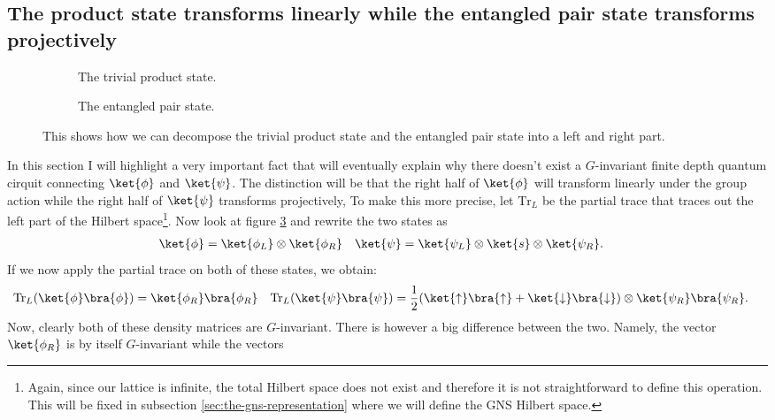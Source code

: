 \subsection{The product state transforms linearly while the entangled pair state transforms projectively}
\begin{figure}
	\centering
	\begin{subfigure}{\textwidth}
		\centering
		
		\caption{The trivial product state.}
		\label{fig:TrivialProductStateTwoParts}
	\end{subfigure}
	\begin{subfigure}{\textwidth}
		\centering
		
		\caption{The entangled pair state.}
		\label{fig:FakeAKLT_State_TwoParts}
	\end{subfigure}
	\caption{This shows how we can decompose the trivial product state and the entangled pair state into a left and right part.}
	\label{fig:TheTwoHaldanePhasesTwoParts}
\end{figure}
In this section I will highlight a very important fact that will eventually explain why there doesn't exist a $G$-invariant finite depth quantum cirquit connecting $\ket{\phi}$ and $\ket{\psi}$. The distinction will be that the right half of $\ket{\phi}$ will transform linearly under the group action while the right half of $\ket{\psi}$ transforms projectively, To make this more precise, let $\textrm{Tr}_L$ be the partial trace that traces out the left part of the Hilbert space\footnote{Again, since our lattice is infinite, the total Hilbert space does not exist and therefore it is not straightforward to define this operation. This will be fixed in subsection \ref{sec:the-gns-representation} where we will define the GNS Hilbert space.}. Now look at figure \ref{fig:TheTwoHaldanePhasesTwoParts} and rewrite the two states as
\begin{align}
	\ket{\phi}&=\ket{\phi_L}\otimes\ket{\phi_R}&\ket{\psi}&=\ket{\psi_L}\otimes\ket{s}\otimes\ket{\psi_R}.
\end{align}
If we now apply the partial trace on both of these states, we obtain:
\begin{align}
	\textrm{Tr}_L(\ket{\phi}\bra{\phi})&=\ket{\phi_R}\bra{\phi_R}&\textrm{Tr}_L(\ket{\psi}\bra{\psi})&=\frac{1}{2}(\ket{\uparrow}\bra{\uparrow}+\ket{\downarrow}\bra{\downarrow})\otimes \ket{\psi_R}\bra{\psi_R}.
\end{align}
Now, clearly both of these density matrices are $G$-invariant. There is however a big difference between the two. Namely, the vector $\ket{\phi_R}$ is by itself $G$-invariant while the vectors
